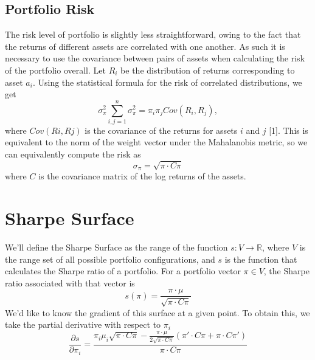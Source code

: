 \documentclass{article}
\begin{document}
\subsection{Portfolio Risk}
The risk level of portfolio is slightly less straightforward, owing to the fact that the returns of different assets are correlated with one another. As such it is necessary to use the covariance between pairs of assets when calculating the risk of the portfolio overall. Let $R_i$ be the distribution of returns corresponding to asset $a_i$. Using the statistical formula for the risk of correlated distributions, we get
\[\sigma_\pi^2 \sum_{i,j=1}^n \sigma_\pi^2 = \pi_i \pi_j Cov(R_i,R_j),\]
where $Cov(Ri,Rj)$ is the covariance of the returns for assets $i$ and $j$ [1].  This is equivalent to the norm of the weight vector under the Mahalanobis metric, so we can equivalently compute the risk as
\begin{equation}
\sigma_\pi = \sqrt{\pi \cdot C\pi}
\end{equation}
where $C$ is the covariance matrix of the log returns of the assets.


\section{Sharpe Surface}


We'll define the Sharpe Surface as the range of the function $s: V \rightarrow \mathbb{R}$, where $V$ is the range set of all possible portfolio configurations, and $s$ is the function that calculates the Sharpe ratio of a portfolio.
For a portfolio vector $\pi\in V$, the Sharpe ratio associated with that vector is
\[s(\pi) = \frac{\pi \cdot \mu}{\sqrt{\pi \cdot C \pi}}\]
We'd like to know the gradient of this surface at a given point.  To obtain this, we take the partial derivative with respect to $\pi_i$ 
\[\frac{\partial s}{\partial \pi_i} = \frac{\pi_i \mu_i \sqrt{\pi \cdot C \pi} - \frac{ \pi \cdot \mu}{2\sqrt{\pi \cdot C \pi}}(\pi'\cdot C\pi + \pi \cdot C\pi') }{\pi \cdot C \pi}\]
\end{document}
